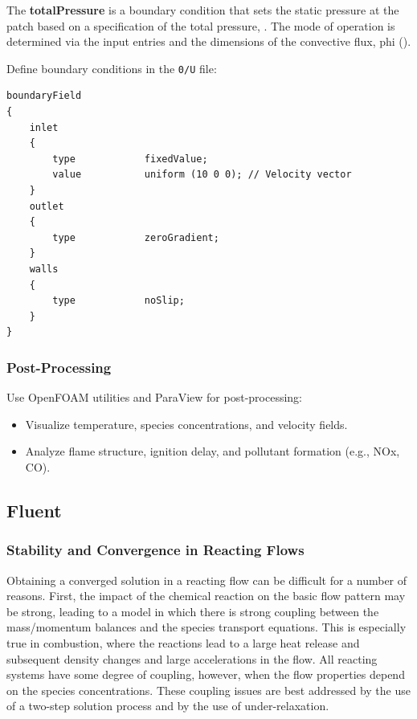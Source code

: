 \documentclass[12pt]{article}
\begin{document}
The \textbf{totalPressure} is a boundary condition that sets the static pressure at the patch based on a specification of the total pressure, . The mode of operation is determined via the input entries and the dimensions of the convective flux, phi ().

Define boundary conditions in the \texttt{0/U} file:

\begin{lstlisting}[language={}, caption={Boundary Conditions in OpenFOAM}]
boundaryField
{
    inlet
    {
        type            fixedValue;
        value           uniform (10 0 0); // Velocity vector
    }
    outlet
    {
        type            zeroGradient;
    }
    walls
    {
        type            noSlip;
    }
}
\end{lstlisting}

\subsubsection*{Post-Processing}
Use OpenFOAM utilities and ParaView for post-processing:

\begin{itemize}
    \item Visualize temperature, species concentrations, and velocity fields.
    \item Analyze flame structure, ignition delay, and pollutant formation (e.g., NOx, CO).
\end{itemize}

\subsection{Fluent}\label{subsec:Fluent}

\subsubsection{Stability and Convergence in Reacting Flows}
Obtaining a converged solution in a reacting flow can be difficult for a number of reasons. First, the impact of the chemical reaction on the basic flow pattern may be strong, leading to a model in which there is strong coupling between the mass/momentum balances and the species transport equations. This is especially true in combustion, where the reactions lead to a large heat release and subsequent density changes and large accelerations in the flow. All reacting systems have some degree of coupling, however, when the flow properties depend on the species concentrations. These coupling issues are best addressed by the use of a two-step solution process and by the use of under-relaxation.
\end{document}
